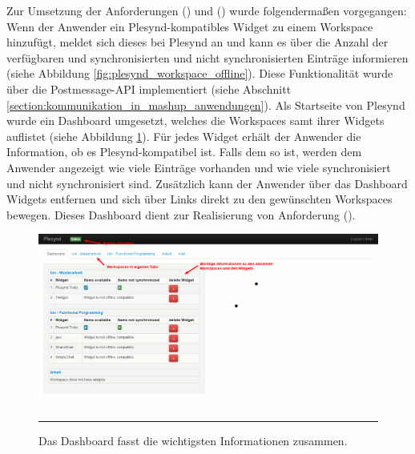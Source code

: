 Zur Umsetzung der Anforderungen  (\emph{\requirementWidgetInformSystem}) und  (\emph{\requirementWidgetInformUser})  wurde folgendermaßen vorgegangen: Wenn der Anwender ein Plesynd-kompatibles Widget zu einem Workspace hinzufügt, meldet sich dieses bei Plesynd an und kann es über die Anzahl der verfügbaren und synchronisierten und nicht synchronisierten Einträge informieren (siehe Abbildung \ref{fig:plesynd_workspace_offline}). Diese Funktionalität wurde über die Postmessage-API implementiert (siehe Abschnitt \ref{section:kommunikation_in_mashup_anwendungen}). Als Startseite von Plesynd wurde ein Dashboard umgesetzt, welches die Workspaces samt ihrer Widgets auflistet (siehe Abbildung \ref{fig:plesynd_dashboard}). Für jedes Widget erhält der Anwender die Information, ob es Plesynd-kompatibel ist. Falls dem so ist, werden dem Anwender angezeigt wie viele Einträge vorhanden und wie viele synchronisiert und nicht synchronisiert sind. Zusätzlich kann der Anwender über das Dashboard Widgets entfernen und sich über Links direkt zu den gewünschten Workspaces bewegen. Dieses Dashboard dient zur Realisierung von Anforderung  (\emph{\requirementDashboard}).
\begin{figure}[H]
  \centering
  \includegraphics[width=\textwidth]{./Figures/plesynd_dashboard.png}
    \rule{35em}{0.5pt}
  \caption[Plesynd User"=Interface: Dashboard]{Das Dashboard fasst die wichtigsten Informationen zusammen.}
  \label{fig:plesynd_dashboard}
\end{figure}

